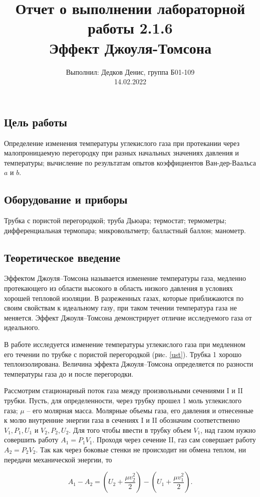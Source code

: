 \documentclass[12pt,a4paper]{article}
\author{\normalsize Выполнил: Дедков Денис, группа Б01-109 \\
	\normalsize 14.02.2022}
\date{}
\title{
	\large Отчет о выполнении лабораторной работы 2.1.6 \\
	\Large Эффект Джоуля-Томсона \\ 
	
}
\begin{document}
	\maketitle
	\subsection*{Цель работы} 
	 Определение изменения температуры углекислого газа при протекании через малопроницаемую перегородку при разных начальных значениях давления и температуры;
	 вычисление по результатам опытов коэффициентов Ван-дер-Ваальса $a$ и $b$.
	
	\subsection*{Оборудование и приборы} Трубка с пористой перегородкой; труба Дьюара; термостат; термометры; дифференциальная термопара; микровольтметр; балластный баллон; манометр.
	
\subsection*{Теоретическое введение}
Эффектом Джоуля–Томсона называется изменение температуры газа, медленно протекающего из области высокого в область низкого давления в условиях хорошей тепловой изоляции. В разреженных газах, которые приближаются по своим свойствам к идеальному газу, при таком течении температура газа не меняется. Эффект Джоуля–Томсона демонстрирует отличие исследуемого газа от идеального.

В работе исследуется изменение температуры углекислого газа при медленном его течении по трубке с пористой перегородкой (риc. \ref{ust}). Трубка 1 хорошо теплоизолирована. Величина эффекта Джоуля–Томсона определяется по разности температуры газа до и после перегородки.

Рассмотрим стационарный поток газа между произвольными сечениями I и II трубки. Пусть, для определенности, через трубку прошел 1 моль углекислого газа; $ \mu $ -- его молярная масса. Молярные объемы газа, его давления и отнесенные к молю внутренние энергии газа в сечениях I и II обозначим соответственно $ V_1, P_1, U_1 $ и $ V_2, P_2, U_2 $. Для того чтобы ввести в трубку объем $ V_1 $, над газом нужно совершить работу $ A_1 = P_1V_1 $. Проходя через сечение II, газ сам совершает работу $ A_2 = P_2V_2 $. Так как через боковые стенки не происходит ни обмена теплом, ни передачи механической энергии, то

\begin{equation}\label{1}
	A_1-A_2=\left(U_2+\frac{\mu v_2^2}{2}\right) - \left(U_1 + \frac{\mu v_1^2}{2}\right).
\end{equation}
\end{document}
